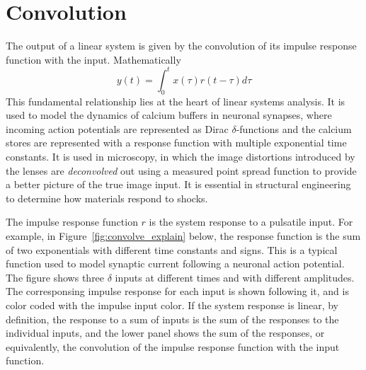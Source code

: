 \section{Convolution}
\label{sec:convolution}

The output of a linear system is given by the convolution of its
impulse response function with the input.  Mathematically
\begin{equation}
  y(t) = \int_0^t x(\tau)r(t-\tau)d\tau
\end{equation}
This fundamental relationship lies at the heart of linear systems
analysis.  It is used to model the dynamics of calcium buffers in
neuronal synapses, where incoming action potentials are represented as
Dirac $\delta$-functions and the calcium stores are represented with a
response function with multiple exponential time constants.  It is
used in microscopy, in which the image distortions introduced by the
lenses are \textit{deconvolved} out using a measured point spread
function to provide a better picture of the true image input.  It is
essential in structural engineering to determine how materials respond
to shocks.

The impulse response function $r$ is the system response to a
pulsatile input.  For example, in Figure~\ref{fig:convolve_explain}
below, the response function is the sum of two exponentials with
different time constants and signs.  This is a typical function used
to model synaptic current following a neuronal action potential.  The
figure shows three $\delta$ inputs at different times and with
different amplitudes.  The corresponsing impulse response for each
input is shown following it, and is color coded with the impulse input
color.  If the system response is linear, by definition, the response
to a sum of inputs is the sum of the responses to the individual
inputs, and the lower panel shows the sum of the responses, or
equivalently, the convolution of the impulse response function with
the input function.

